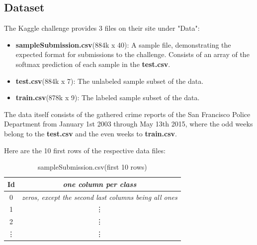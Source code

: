\documentclass[12pt,a4paper]{scrartcl}
\begin{document}
\subsection{Dataset}\label{ss:dataset}
The Kaggle challenge \citep{kgl_sf_crime} provides 3 files on their site under "Data":
\begin{itemize}
\item \textbf{sampleSubmission.csv}(884k x 40): A sample file, demonstrating the expected format for submissions to the challenge. Consists of an array of the softmax prediction of each sample in the \textbf{test.csv}.
\item \textbf{test.csv}(884k x 7): The unlabeled sample subset of the data.
\item \textbf{train.csv}(878k x 9): The labeled sample subset of the data.
\end{itemize}
The data itself consists of the gathered crime reports of the San Francisco Police Department from January 1st 2003 through May 13th 2015, where the odd weeks belong to the \textbf{test.csv} and the even weeks to \textbf{train.csv}.

Here are the 10 first rows of the respective data files:

\begin{table}[htbp]
\centering
\setlength\tabcolsep{2pt}
\begin{tabular}{|cc|}\hline
Id&\textit{one column per class}\\\hline\hline
0&\textit{zeros, except the second last columns being all ones}\\
1&\vdots\\
2&\vdots\\
\vdots&\vdots\\\hline
\end{tabular}
\caption{sampleSubmission.csv(first 10 rows)}
\label{tab:sampleSubmission.csv}
\end{table}
\end{document}
